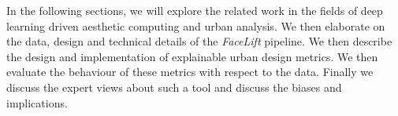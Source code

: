 In the following sections, we will explore the related work in the fields of deep learning driven aesthetic computing and urban analysis. We then elaborate on the data, design and technical details of the \textit{FaceLift} pipeline. We then describe the design and implementation of explainable urban design metrics. We then evaluate the behaviour of these metrics with respect to the data. Finally we discuss the expert views about such a tool and discuss the biases and implications.
